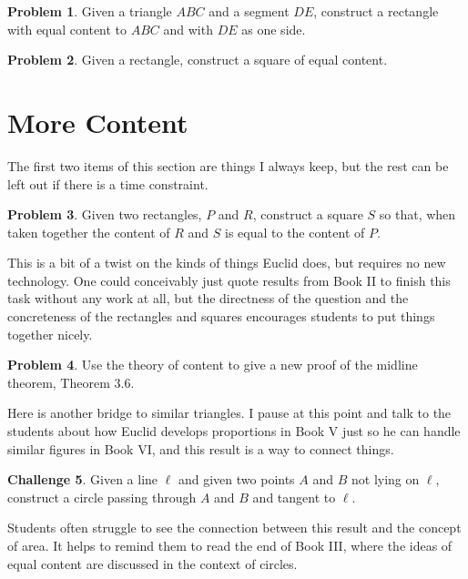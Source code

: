 \documentclass{tufte-handout}
\theoremstyle{definition}
\newtheorem{problem}{Problem}[section]
\newtheorem{challenge}[problem]{Challenge}
\begin{document}
\begin{problem}\label{prob:rectify-triangle}
Given a triangle $ABC$ and a segment $DE$, construct a rectangle with equal content to $ABC$ and with $DE$ as one side.
\end{problem}


\begin{problem}\label{prob:quadrature-of-rectangle}
Given a rectangle, construct a square of equal content.
\end{problem}

\clearpage
\setcounter{section}{14}
\setcounter{problem}{0}
\section{More Content}

The first two items of this section are things I always keep, but the rest can be left out if there is a time constraint.

\begin{problem}\label{prob:subtract-rect}
Given two rectangles, $P$ and $R$, construct a square $S$ so that, when taken together the content of $R$ and $S$ is equal to the content of $P$.
\end{problem}

This is a bit of a twist on the kinds of things Euclid does, but requires no new technology. One could conceivably just quote results from Book II to finish this task without any work at all, but the directness of the question and the concreteness of the rectangles and squares encourages students to put things together nicely.

\begin{problem} \label{conj:parallel-in-triangle} Use the theory of content to give a new proof of the midline theorem, Theorem 3.6.
\end{problem}

Here is another bridge to similar triangles. I pause at this point and talk to the students about how Euclid develops proportions in Book V just so he can handle similar figures in Book VI, and this result is a way to connect things.

\begin{challenge}\label{chal:circle-given-two-points-tangent}
Given a line $\ell$ and given two points $A$ and $B$ not lying on $\ell$, construct a circle passing through $A$ and $B$ and tangent to $\ell$.
\end{challenge}

Students often struggle to see the connection between this result and the concept of area. It helps to remind them to read the end of Book III, where the ideas of equal content are discussed in the context of circles.
\end{document}
